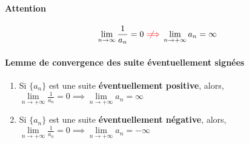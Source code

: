 \documentclass[2pt]{report}
\newcommand{\notimplies}{%
  \mathrel{{\ooalign{\hidewidth$\not\phantom{=}$\hidewidth\cr$\implies$}}}}
\begin{document}
\begin{multicols*}{3}
    \paragraph{Attention}
        \begin{align*}
            \lim\limits_{n\to\infty  }\frac{1}{a_n} = 0 
            \textcolor{red}{\notimplies}
            \lim\limits_{n\to+\infty }a_n  = \infty
        \end{align*}    

    \paragraph{Lemme de convergence des suite éventuellement signées}



        \begin{enumerate}
            \item 
                Si $\{ a_n \}$ est une suite 
                \textbf{éventuellement positive}, 
                alors,  
                    $\lim\limits_{n\to+\infty }\frac{1}{a_n}  = 0 
                    \implies 
                    \lim\limits_{n\to+\infty }a_n  = \infty$
            \item                                 
                Si $\{ a_n \}$ est une suite 
                \textbf{éventuellement négative}, 
                alors,   
                    $\lim\limits_{n\to+\infty }\frac{1}{a_n}  = 0 
                    \implies 
                    \lim\limits_{n\to+\infty }a_n  = -\infty$
        \end{enumerate} 


 


\end{multicols*}
\end{document}
